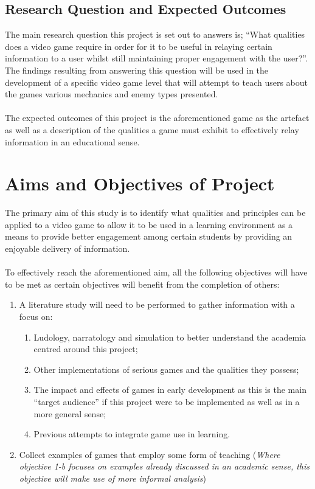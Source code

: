 \subsection{Research Question and Expected Outcomes}
The main research question this project is set out to answers is; “What qualities does a video game require in order for it to be useful in relaying certain information to a user whilst still maintaining proper engagement with the user?”. The findings resulting from answering this question will be used in the development of a specific video game level that will attempt to teach users about the games various mechanics and enemy types presented. 
\\\\
The expected outcomes of this project is the aforementioned game as the artefact as well as a description of the qualities a game must exhibit to effectively relay information in an educational sense.

\section{Aims and Objectives of Project}
The primary aim of this study is to identify what qualities and principles can be applied to a video game to allow it to be used in a learning environment as a means to provide better engagement among certain students by providing an enjoyable delivery of information. 
\\\\
To effectively reach the aforementioned aim, all the following objectives will have to be met as certain objectives will benefit from the completion of others:
\begin{enumerate}
\item A literature study will need to be performed to gather information with a focus on:
\begin{enumerate}
\item Ludology, narratology and simulation to better understand the academia centred around this project;
\item Other implementations of serious games and the qualities they possess;
\item The impact and effects of games in early development as this is the main “target audience” if this project were to be implemented as well as in a more general sense;
\item Previous attempts to integrate game use in learning.
\end{enumerate}
\item Collect examples of games that employ some form of teaching 
(\textit{Where objective 1-b focuses on examples already discussed in an academic sense, this objective will make use of more informal analysis})
\end{enumerate}


